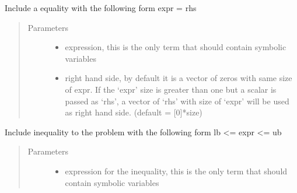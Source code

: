 \documentclass[letterpaper,10pt,english]{sphinxmanual}
\begin{document}
\begin{fulllineitems}
\begin{fulllineitems}
\label{\detokenize{yaocptool.optimization:yaocptool.optimization.abstract_optimization_problem.AbstractOptimizationProblem.include_equality}}
Include a equality with the following form
expr = rhs
\begin{quote}\begin{description}
\item[{Parameters}] \leavevmode\begin{itemize}
\item {} 
 \textendash{} expression, this is the only term that should contain symbolic variables

\item {} 
 \textendash{} right hand side, by default it is a vector of zeros with same size of expr. If the  ‘expr’ size is
greater than one but a scalar is passed as ‘rhs’, a vector of ‘rhs’ with size of ‘expr’ will be used as
right hand side. (default = {[}0{]}*size)

\end{itemize}

\end{description}\end{quote}

\end{fulllineitems}


\begin{fulllineitems}
\label{\detokenize{yaocptool.optimization:yaocptool.optimization.abstract_optimization_problem.AbstractOptimizationProblem.include_inequality}}
Include inequality to the problem with the following form
lb \textless{}= expr \textless{}= ub
\begin{quote}\begin{description}
\item[{Parameters}] \leavevmode\begin{itemize}
\item {} 
 \textendash{} expression for the inequality, this is the only term that should contain symbolic variables


\end{itemize}
\end{description}
\end{quote}
\end{fulllineitems}
\end{fulllineitems}
\end{document}
